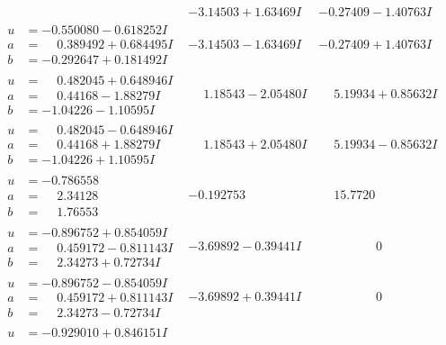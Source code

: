 \documentclass[1p]{elsarticle_modified}
\theoremstyle{definition}
\begin{document}
$$\begin{array}{c|c|c}
 & -3.14503 + 1.63469 I & -0.27409 - 1.40763 I \\ \hline\begin{aligned}
u &= -0.550080 - 0.618252 I \\
a &= \phantom{-}0.389492 + 0.684495 I \\
b &= -0.292647 + 0.181492 I\end{aligned}
 & -3.14503 - 1.63469 I & -0.27409 + 1.40763 I \\ \hline\begin{aligned}
u &= \phantom{-}0.482045 + 0.648946 I \\
a &= \phantom{-}0.44168 - 1.88279 I \\
b &= -1.04226 - 1.10595 I\end{aligned}
 & \phantom{-}1.18543 - 2.05480 I & \phantom{-}5.19934 + 0.85632 I \\ \hline\begin{aligned}
u &= \phantom{-}0.482045 - 0.648946 I \\
a &= \phantom{-}0.44168 + 1.88279 I \\
b &= -1.04226 + 1.10595 I\end{aligned}
 & \phantom{-}1.18543 + 2.05480 I & \phantom{-}5.19934 - 0.85632 I \\ \hline\begin{aligned}
u &= -0.786558\phantom{ +0.000000I} \\
a &= \phantom{-}2.34128\phantom{ +0.000000I} \\
b &= \phantom{-}1.76553\phantom{ +0.000000I}\end{aligned}
 & -0.192753\phantom{ +0.000000I} & \phantom{-}15.7720\phantom{ +0.000000I} \\ \hline\begin{aligned}
u &= -0.896752 + 0.854059 I \\
a &= \phantom{-}0.459172 - 0.811143 I \\
b &= \phantom{-}2.34273 + 0.72734 I\end{aligned}
 & -3.69892 - 0.39441 I & \phantom{-0.000000 } 0 \\ \hline\begin{aligned}
u &= -0.896752 - 0.854059 I \\
a &= \phantom{-}0.459172 + 0.811143 I \\
b &= \phantom{-}2.34273 - 0.72734 I\end{aligned}
 & -3.69892 + 0.39441 I & \phantom{-0.000000 } 0 \\ \hline\begin{aligned}
u &= -0.929010 + 0.846151 I \\

\end{aligned}
\end{array}$$
\end{document}
